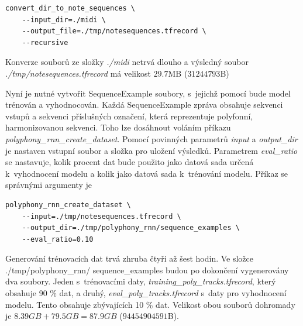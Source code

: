 \begin{verbatim}
convert_dir_to_note_sequences \
    --input_dir=./midi \
    --output_file=./tmp/notesequences.tfrecord \
    --recursive
\end{verbatim} 
Konverze souborů ze složky \emph{./midi} netrvá dlouho
a výsledný soubor \emph{./tmp/notesequences.tfrecord}
má velikost $29.7$MB ($31 244 793$B)
\par

Nyní je nutné vytvořit SequenceExample soubory,
s~jejichž pomocí bude model trénován a vyhodnocován.
Každá SequenceExample zpráva obsahuje sekvenci vstupů a
sekvenci příslušných označení, 
která reprezentuje polyfonní, harmonizovanou sekvenci.
Toho lze dosáhnout voláním příkazu \emph{polyphony\_rnn\_create\_dataset}.
Pomocí povinných parametrů \emph{input} a \emph{output\_dir} 
je nastaven vstupní soubor a složka pro uložení výsledků.
Parametrem \emph{eval\_ratio} se nastavuje, kolik procent dat 
bude použito jako datová sada určená k~vyhodnocení modelu
a kolik jako datová sada k~trénování modelu.
\cite{google_git_polyphony}
Příkaz se správnými argumenty je

\begin{verbatim}
polyphony_rnn_create_dataset \
    --input=./tmp/notesequences.tfrecord \
    --output_dir=./tmp/polyphony_rnn/sequence_examples \
    --eval_ratio=0.10
\end{verbatim}
Generování trénovacích dat trvá zhruba čtyři až šest hodin.
Ve složce ./tmp/polyphony\_rnn/ sequence\_examples budou po dokončení
vygenerovány dva soubory. 
Jeden s~trénovacími daty, \emph{training\_poly\_tracks.tfrecord},
který obsahuje 90 \% dat,
a druhý, \emph{eval\_poly\_tracks.tfrecord} s~daty pro vyhodnocení modelu.
Tento obsahuje zbývajících 10 \% dat.
Velikost obou souborů dohromady je $8.39GB + 79.5GB = 87.9GB$ ($94 454 904 591$B).
\par

